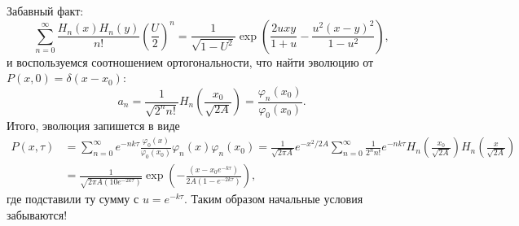 Забавный факт:
\begin{equation*}
	\sum_{n=0}^{\infty} \frac{H_n(x) H_n(y)}{n!} \left(\frac{U}{2}\right)^n = \frac{1}{\sqrt{1-U^2}} \exp\left(
		\frac{2 u xy}{1+u} - \frac{u^2 (x-y)^2}{1-u^2}
	\right),
\end{equation*}
и воспользуемся соотношением ортогональности, что найти эволюцию от $P(x, 0) = \delta(x-x_0)$:
\begin{equation*}
	a_n = \frac{1}{\sqrt{2^n n!}} H_n\left(\frac{x_0}{\sqrt{2A}}\right) = \frac{\varphi_n(x_0)}{\varphi_0(x_0)}.
\end{equation*}
Итого, эволюция запишется в виде
\begin{align*}
	P(x, \tau) &= \sum_{n=0}^{\infty} e^{-n k \tau} \frac{\varphi_0(x)}{\varphi_0(x_0)} \varphi_n(x) \varphi_n(x_0)
	= \frac{1}{\sqrt{2\pi A}} e^{-x^2/2A} \sum_{n=0}^{\infty} \frac{1}{2^n n!} e^{-n k \tau} H_n\left(\frac{x_0}{\sqrt{2A}}\right) H_n \left(\frac{x}{\sqrt{2A}}\right) \\ 
	&= \frac{1}{\sqrt{2\pi A(10e^{-2k \tau})}} \exp\left(
		- \frac{(x-x_0 e^{- k \tau})}{2A(1-e^{-2 k \tau})}
	\right),
\end{align*}
где подставили ту сумму с $u = e^{- k \tau}$. Таким образом начальные условия забываются!



